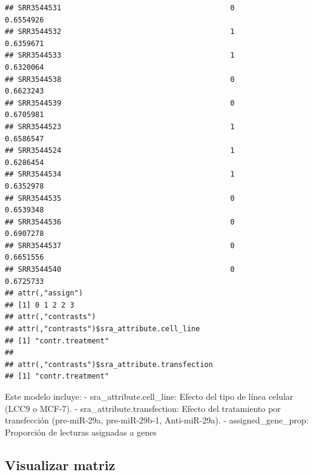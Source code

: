 \documentclass[
]{article}
\newenvironment{Shaded}{\begin{snugshade}}{\end{snugshade}}
\newcommand{\AttributeTok}[1]{\textcolor[rgb]{0.13,0.29,0.53}{#1}}
\newcommand{\CommentTok}[1]{\textcolor[rgb]{0.56,0.35,0.01}{\textit{#1}}}
\newcommand{\DecValTok}[1]{\textcolor[rgb]{0.00,0.00,0.81}{#1}}
\newcommand{\DocumentationTok}[1]{\textcolor[rgb]{0.56,0.35,0.01}{\textbf{\textit{#1}}}}
\newcommand{\FunctionTok}[1]{\textcolor[rgb]{0.13,0.29,0.53}{\textbf{#1}}}
\newcommand{\NormalTok}[1]{#1}
\newcommand{\OtherTok}[1]{\textcolor[rgb]{0.56,0.35,0.01}{#1}}
\newcommand{\SpecialCharTok}[1]{\textcolor[rgb]{0.81,0.36,0.00}{\textbf{#1}}}
\begin{document}
\begin{verbatim}
## SRR3544531                                       0          0.6554926
## SRR3544532                                       1          0.6359671
## SRR3544533                                       1          0.6320064
## SRR3544538                                       0          0.6623243
## SRR3544539                                       0          0.6705981
## SRR3544523                                       1          0.6586547
## SRR3544524                                       1          0.6286454
## SRR3544534                                       1          0.6352978
## SRR3544535                                       0          0.6539348
## SRR3544536                                       0          0.6907278
## SRR3544537                                       0          0.6651556
## SRR3544540                                       0          0.6725733
## attr(,"assign")
## [1] 0 1 2 2 3
## attr(,"contrasts")
## attr(,"contrasts")$sra_attribute.cell_line
## [1] "contr.treatment"
## 
## attr(,"contrasts")$sra_attribute.transfection
## [1] "contr.treatment"
\end{verbatim}

Este modelo incluye: - sra\_attribute.cell\_line: Efecto del tipo de
línea celular (LCC9 o MCF-7). - sra\_attribute.transfection: Efecto del
tratamiento por transfección (pre-miR-29a, pre-miR-29b-1, Anti-miR-29a).
- assigned\_gene\_prop: Proporción de lecturas asignadas a genes

\subsection{Visualizar matriz}\label{visualizar-matriz}

\begin{Shaded}
\end{Shaded}
\end{document}
